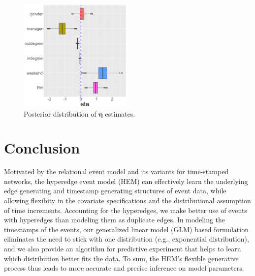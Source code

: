 \documentclass[ba]{imsart}
\numberwithin{equation}{section}
\theoremstyle{plain}
\begin{document}
				\begin{figure}[!t]
					\centering
					\includegraphics[width=0.495\textwidth]{img/etaplotnew-1.png}	
					\caption {Posterior distribution of $\boldsymbol{\eta}$ estimates.}
					\label{figure:etaresults}
				\end{figure}
\section{Conclusion}\label{sec:conclusion}
Motivated by the relational event model \citep{Butts2008} and its variants for time-stamped networks, the hyperedge event model (HEM) can effectively learn the underlying edge generating and timestamp generating structures of event data, while allowing flexibity in the covariate specifications and the distributional assumption of time increments.
Accounting for the hyperedges, we make better use of events with hyperedges than modeling them as duplicate edges. In modeling the timestamps of the events, our generalized linear model (GLM) based formulation eliminates the need to stick with one distribution (e.g., exponential distribution), and we also provide an algorithm for predictive experiment that helps to learn which distribution better fits the data. To sum, the HEM's flexible generative process thus leads to more accurate and precise inference on model parameters.
\end{document}
